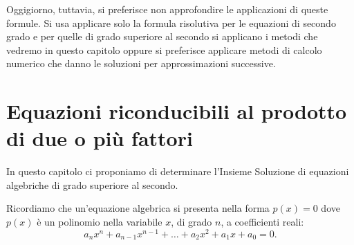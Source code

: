 \begin{exrig}
\begin{esempio}
Oggigiorno, tuttavia, si preferisce non approfondire le applicazioni di queste formule. Si usa applicare solo la formula risolutiva per le equazioni di secondo grado e per quelle di grado superiore al secondo si applicano i metodi che vedremo in questo capitolo oppure si preferisce applicare metodi di calcolo numerico che danno le soluzioni per approssimazioni successive.
\end{esempio}
\end{exrig}
\section{Equazioni riconducibili al prodotto di due o più fattori}
In questo capitolo ci proponiamo di determinare l’Insieme Soluzione di equazioni algebriche di grado superiore al secondo.

Ricordiamo che un’equazione algebrica si presenta nella forma $p(x)=0$ dove $p(x)$ è un polinomio nella variabile $x$, di grado $n$, a coefficienti reali: \[a_nx^n+a_{n-1}x^{n-1}+ \ldots +a_2x^2+a_1x+a_0=0.\]

